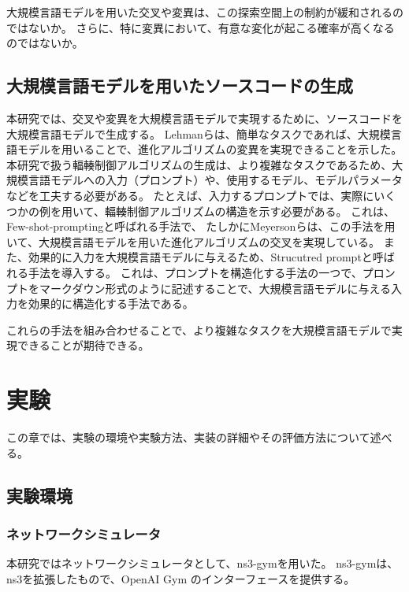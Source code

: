 \documentclass[a4paper,11pt]{jreport}
\begin{document}
大規模言語モデルを用いた交叉や変異は、この探索空間上の制約が緩和されるのではないか。
さらに、特に変異において、有意な変化が起こる確率が高くなるのではないか。

\section{大規模言語モデルを用いたソースコードの生成}

本研究では、交叉や変異を大規模言語モデルで実現するために、ソースコードを大規模言語モデルで生成する。
Lehmanら\cite{lehman2022evolution}は、簡単なタスクであれば、大規模言語モデルを用いることで、進化アルゴリズムの変異を実現できることを示した。
本研究で扱う輻輳制御アルゴリズムの生成は、より複雑なタスクであるため、大規模言語モデルへの入力（プロンプト）や、使用するモデル、モデルパラメータなどを工夫する必要がある。
たとえば、入力するプロンプトでは、実際にいくつかの例を用いて、輻輳制御アルゴリズムの構造を示す必要がある。
これは、Few-shot-prompting\cite{gpt3}と呼ばれる手法で、
たしかにMeyersonら\cite{meyerson2023language}は、この手法を用いて、大規模言語モデルを用いた進化アルゴリズムの交叉を実現している。
また、効果的に入力を大規模言語モデルに与えるため、Strucutred prompt\cite{hao2022structured}と呼ばれる手法を導入する。
これは、プロンプトを構造化する手法の一つで、プロンプトをマークダウン形式のように記述することで、大規模言語モデルに与える入力を効果的に構造化する手法である。

これらの手法を組み合わせることで、より複雑なタスクを大規模言語モデルで実現できることが期待できる。

\newpage

\chapter{実験}
\label{chapter:experiment}
この章では、実験の環境や実験方法、実装の詳細やその評価方法について述べる。

\section{実験環境}

\subsection{ネットワークシミュレータ}

本研究ではネットワークシミュレータとして、ns3-gym\cite{ns3gym}を用いた。
ns3-gymは、ns3\cite{ns3-2012, ns3-2010}を拡張したもので、OpenAI Gym\cite{gym}
のインターフェースを提供する。
\end{document}
